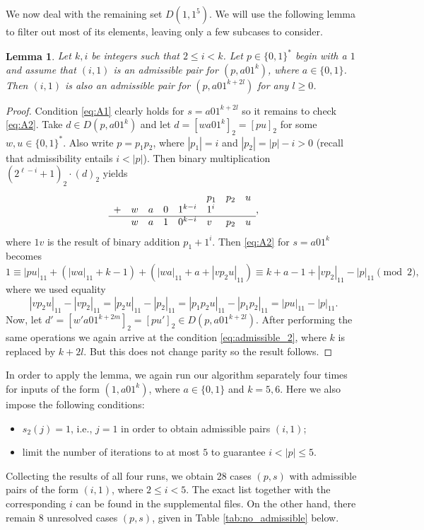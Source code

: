 \documentclass[a4paper,11pt]{amsart}
\newtheorem{lem}[thm]{Lemma}
\theoremstyle{definition}
\begin{document}
We now deal with the remaining set $D(1,1^5)$. We will use the following lemma to filter out most of its elements, leaving only a few subcases to consider.

\begin{lem} \label{lem:suffix_reduction}
Let $k, i$ be integers such that $2 \leq i < k$. Let $p \in \{0,1\}^{*}$ begin with a $1$ and assume that $(i,1)$ is an admissible pair for $(p,a01^k)$, where $a \in \{0,1\}$. Then $(i,1)$ is also an admissible pair for $(p,a01^{k+2l})$ for any $l \geq 0$.
\end{lem}
\begin{proof}
Condition \eqref{eq:A1} clearly holds for $s = a01^{k+2l}$ so it remains to check \eqref{eq:A2}. Take $d \in D(p,a01^k)$ and let $d=[wa01^k]_2 = [pu]_2$ for some $w,u \in \{0,1\}^*$. Also write $p = p_1 p_2$, where $|p_1| = i$ and $|p_2| = |p|-i > 0$  (recall that admissibility entails $i < |p|$). Then binary multiplication $(2^{\ell-i}+1)_2 \cdot (d)_2$ yields
$$ \begin{array}{lllllllllll} 
       &    &   &   &         & p_1  &  p_2 & u  \\
+      &  w & a & 0 & 1^{k-i} & 1^i  &      &     \\
\hline &  w & a & 1 & 0^{k-i} & v    &  p_2 & u        
\end{array}, $$
where $1v$ is the result of binary addition $p_1 + 1^i$. Then \eqref{eq:A2} for $s= a01^k$ becomes
\begin{equation} \label{eq:admissible_2}
    1 \equiv |pu|_{11} + (|wa|_{11}+k-1) + (|wa|_{11} + a+ |v p_2 u|_{11}) \equiv k+a-1+|vp_2|_{11}-|p|_{11}  \pmod{2},
\end{equation}
where we used  equality
$$|vp_2u|_{11} - |vp_2|_{11} =  |p_2u|_{11} - |p_2|_{11} = |p_1 p_2u|_{11} -|p_1p_2|_{11} = |pu|_{11} -|p|_{11}.$$
Now, let $d' = [w'a01^{k+2m}]_2 = [pu']_2 \in D(p,a01^{k+2l})$. After performing the same operations we again arrive at the condition \eqref{eq:admissible_2}, where $k$ is replaced by $k+2l$. But this does not change parity so the result follows.
\end{proof}

In order to apply the lemma, we again run our algorithm separately four times for inputs of the form $(1,a01^k)$, where $a \in \{0,1\}$ and $k=5,6$. Here we also impose the following conditions:
\begin{itemize}
  \item $s_2(j) = 1$, i.e., $j=1$ in order to obtain admissible pairs $(i,1)$;
  \item limit the number of iterations to at most $5$ to guarantee $i < |p| \leq 5$.
\end{itemize}
Collecting the results of all four runs, we obtain 28 cases $(p,s)$ with admissible pairs of the form $(i,1)$, where $2 \leq i<5$. The exact list together with the corresponding $i$ can be found in the supplemental files. On the other hand, there remain 8 unresolved cases $(p,s)$, given in Table \ref{tab:no_admissible} below.
\end{document}
